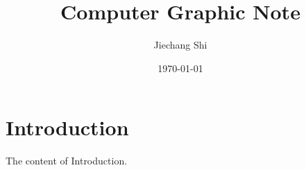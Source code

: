 \documentclass[geye,green,pad,en]{elegantnote}
\title{Computer Graphic Note}
\author{Jiechang Shi}
\date{\today}
\begin{document}
\maketitle

\section{Introduction}
The content of Introduction.
\end{document}
